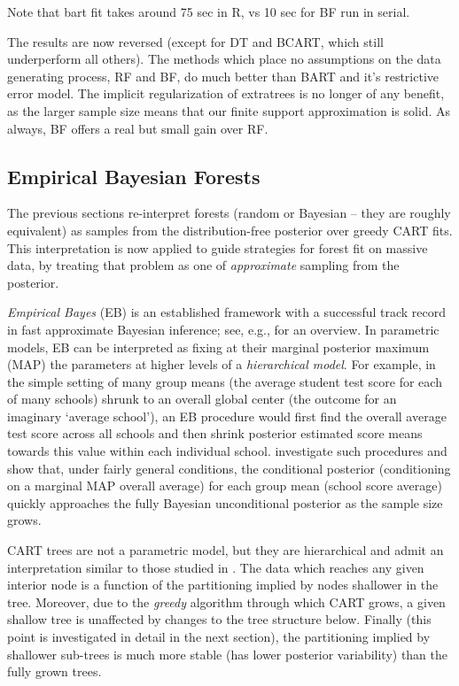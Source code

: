 \documentclass{article}
\begin{document}
    Note that bart fit takes around 75 sec in R, vs 10 sec for BF run in
serial.


    
    The results are now reversed (except for DT and BCART, which still
underperform all others). The methods which place no assumptions on the
data generating process, RF and BF, do much better than BART and it's
restrictive error model. The implicit regularization of extratrees is no
longer of any benefit, as the larger sample size means that our finite
support approximation is solid. As always, BF offers a real but small
gain over RF.

    \subsection{Empirical Bayesian
Forests}\label{empirical-bayesian-forests}

The previous sections re-interpret forests (random or Bayesian -- they
are roughly equivalent) as samples from the distribution-free posterior
over greedy CART fits. This interpretation is now applied to guide
strategies for forest fit on massive data, by treating that problem as
one of \emph{approximate} sampling from the posterior.

\emph{Empirical Bayes} (EB) is an established framework with a
successful track record in fast approximate Bayesian inference; see,
e.g., \cite{efron_large-scale_2010} for an overview. In parametric
models, EB can be interpreted as fixing at their marginal posterior
maximum (MAP) the parameters at higher levels of a \emph{hierarchical
model}. For example, in the simple setting of many group means (the
average student test score for each of many schools) shrunk to an
overall global center (the outcome for an imaginary `average school'),
an EB procedure would first find the overall average test score across
all schools and then shrink posterior estimated score means towards this
value within each individual school. \cite{kass_approximate_1989}
investigate such procedures and show that, under fairly general
conditions, the conditional posterior (conditioning on a marginal MAP
overall average) for each group mean (school score average) quickly
approaches the fully Bayesian unconditional posterior as the sample size
grows.

CART trees are not a parametric model, but they are hierarchical and
admit an interpretation similar to those studied in
\cite{kass_approximate_1989}. The data which reaches any given interior
node is a function of the partitioning implied by nodes shallower in the
tree. Moreover, due to the \emph{greedy} algorithm through which CART
grows, a given shallow tree is unaffected by changes to the tree
structure below. Finally (this point is investigated in detail in the
next section), the partitioning implied by shallower sub-trees is much
more stable (has lower posterior variability) than the fully grown
trees.
\end{document}
